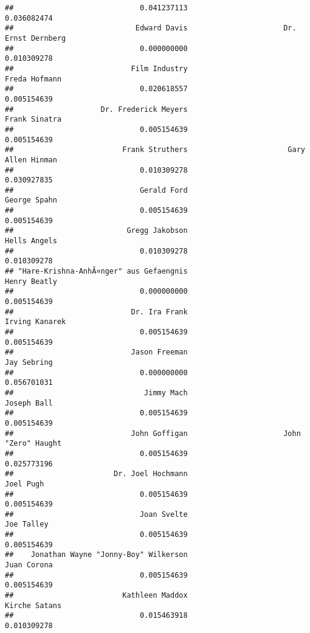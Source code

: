 \documentclass[
]{article}
\begin{document}
\begin{verbatim}
##                             0.041237113                             0.036082474 
##                            Edward Davis                      Dr. Ernst Dernberg 
##                             0.000000000                             0.010309278 
##                           Film Industry                           Freda Hofmann 
##                             0.020618557                             0.005154639 
##                    Dr. Frederick Meyers                           Frank Sinatra 
##                             0.005154639                             0.005154639 
##                         Frank Struthers                       Gary Allen Hinman 
##                             0.010309278                             0.030927835 
##                             Gerald Ford                            George Spahn 
##                             0.005154639                             0.005154639 
##                          Gregg Jakobson                            Hells Angels 
##                             0.010309278                             0.010309278 
## "Hare-Krishna-AnhÃ¤nger" aus Gefaengnis                            Henry Beatly 
##                             0.000000000                             0.005154639 
##                           Dr. Ira Frank                          Irving Kanarek 
##                             0.005154639                             0.005154639 
##                           Jason Freeman                             Jay Sebring 
##                             0.000000000                             0.056701031 
##                              Jimmy Mach                             Joseph Ball 
##                             0.005154639                             0.005154639 
##                           John Goffigan                      John "Zero" Haught 
##                             0.005154639                             0.025773196 
##                       Dr. Joel Hochmann                               Joel Pugh 
##                             0.005154639                             0.005154639 
##                             Joan Svelte                              Joe Talley 
##                             0.005154639                             0.005154639 
##    Jonathan Wayne "Jonny-Boy" Wilkerson                             Juan Corona 
##                             0.005154639                             0.005154639 
##                         Kathleen Maddox                           Kirche Satans 
##                             0.015463918                             0.010309278 

\end{verbatim}
\end{document}
